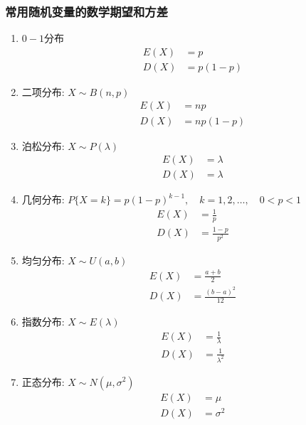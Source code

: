 \subsubsection{常用随机变量的数学期望和方差}
\begin{enumerate}
	\item $0-1$分布
	\begin{align}
		E(X) &= p \\
		D(X) &= p(1-p)
	\end{align}
	\item 二项分布: $X \sim B(n,p)$
	\begin{align}
		E(X) &= np \\
		D(X) &= np(1-p)
	\end{align}
	\item 泊松分布: $X \sim P(\lambda)$
	\begin{align}
		E(X) &= \lambda \\
		D(X) &= \lambda
	\end{align}
	\item 几何分布: $P\{X=k\} = p(1-p)^{k-1}, \quad k = 1, 2, \dots, \quad 0<p<1$
	\begin{align}
		E(X) &= \frac{1}{p} \\
		D(X) &= \frac{1-p}{p^2}
	\end{align}
	\item 均匀分布: $X \sim U(a,b)$
	\begin{align}
		E(X) &= \frac{a+b}{2} \\
		D(X) &= \frac{(b-a)^2}{12}
	\end{align}
	\item 指数分布: $X \sim E(\lambda)$
	\begin{align}
		E(X) &= \frac{1}{\lambda} \\
		D(X) &= \frac{1}{\lambda^2}
	\end{align}
	\item 正态分布: $X \sim N(\mu, \sigma^2)$
	\begin{align}
		E(X) &= \mu \\
		D(X) &= \sigma^2
	\end{align}
\end{enumerate}

